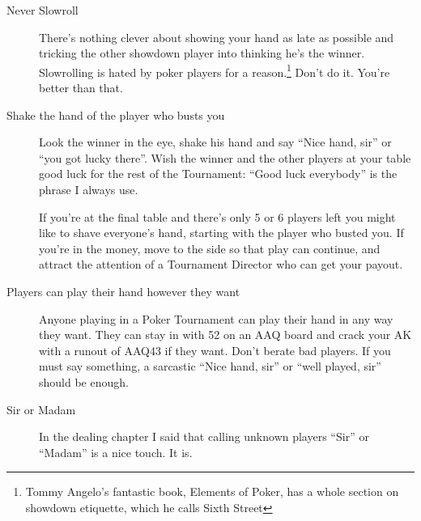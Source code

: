 \begin{description}

\item[Never Slowroll]  There's nothing clever about showing your hand
as late as possible and tricking the other showdown player into thinking
he's the winner. Slowrolling is hated by poker players for a
reason.\footnote{Tommy Angelo's fantastic book, Elements of Poker, has
a whole section on showdown etiquette, which he calls Sixth Street}
Don't do it. You're better than that.


\item[Shake the hand of the player who busts you] Look the winner in the
eye, shake his hand and say ``Nice hand, sir'' or ``you got lucky there''.
Wish the winner and the other players at your table good luck for the
rest of the Tournament: ``Good luck everybody'' is the phrase I always use.

If you're at the final table and there's only 5 or 6 players left you
might like to shave everyone's hand, starting with the player who
busted you. If you're in the money, move to the side so that play
can continue, and attract the attention of a Tournament Director who
can get your payout.

\item[Players can play their hand however they want] Anyone playing in
a Poker Tournament can play their hand in any way they want. They
can stay in with 52 on an AAQ board and crack your AK with a runout
of AAQ43 if they want. Don't berate bad players. If you must say
something, a sarcastic ``Nice hand, sir'' or ``well played, sir'' should
be enough.

\item[Sir or Madam] In the dealing chapter I said that calling
unknown players ``Sir'' or ``Madam'' is a nice touch. It is.

\end{description}
